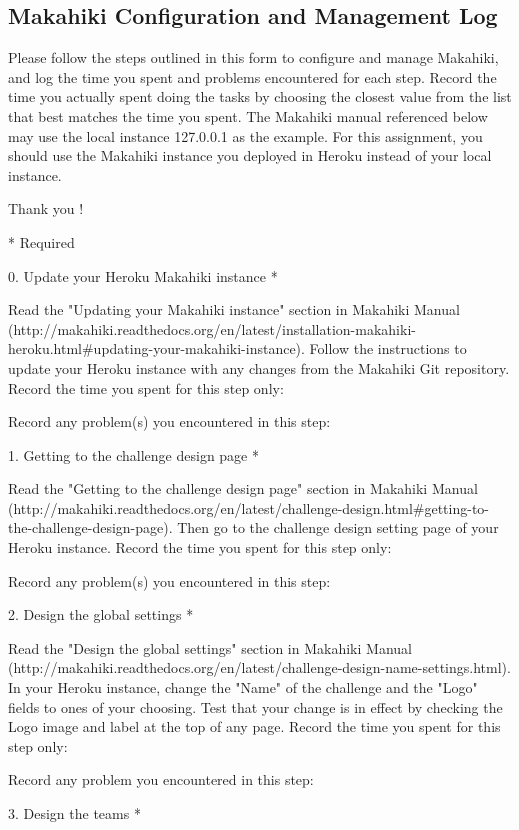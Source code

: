 \subsection{Makahiki Configuration and Management Log}

Please follow the steps outlined in this form to configure and manage Makahiki, and log the time you spent and problems encountered for each step. Record the time you actually spent doing the tasks by choosing the closest value from the list that best matches the time you spent.
The Makahiki manual referenced below may use the local instance 127.0.0.1 as the example. For this assignment, you should use the Makahiki instance you deployed in Heroku instead of your local instance.

Thank you !

* Required

0. Update your Heroku Makahiki instance *

Read the "Updating your Makahiki instance" section in Makahiki Manual (http://makahiki.readthedocs.org/en/latest/installation-makahiki-heroku.html\#updating-your-makahiki-instance). Follow the instructions to update your Heroku instance with any changes from the Makahiki Git repository. Record the time you spent for this step only:

Record any problem(s) you encountered in this step:

1. Getting to the challenge design page *

Read the "Getting to the challenge design page" section in Makahiki Manual (http://makahiki.readthedocs.org/en/latest/challenge-design.html\#getting-to-the-challenge-design-page). Then go to the challenge design setting page of your Heroku instance. Record the time you spent for this step only:

Record any problem(s) you encountered in this step:

2. Design the global settings *

Read the "Design the global settings" section in Makahiki Manual (http://makahiki.readthedocs.org/en/latest/challenge-design-name-settings.html). In your Heroku instance, change the "Name" of the challenge and the "Logo" fields to ones of your choosing. Test that your change is in effect by checking the Logo image and label at the top of any page. Record the time you spent for this step only:

Record any problem you encountered in this step:

3. Design the teams *

